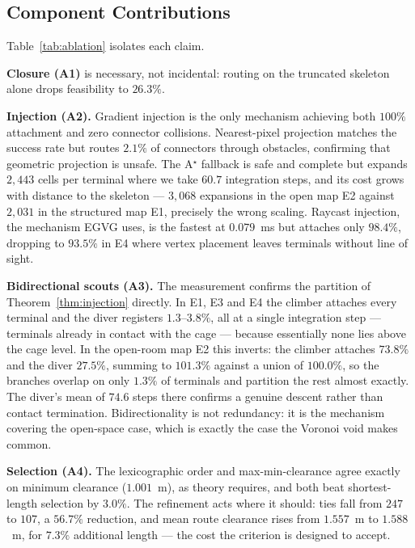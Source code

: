 \documentclass[conference]{IEEEtran}
\begin{document}
\subsection{Component Contributions}

Table~\ref{tab:ablation} isolates each claim.

\textbf{Closure (A1)} is necessary, not incidental: routing on the truncated skeleton alone drops feasibility to $26.3\%$.

\textbf{Injection (A2).} Gradient injection is the only mechanism achieving both $100\%$ attachment and zero connector collisions. Nearest-pixel projection matches the success rate but routes $2.1\%$ of connectors through obstacles, confirming that geometric projection is unsafe. The A$^\star$ fallback is safe and complete but expands $2{,}443$ cells per terminal where we take $60.7$ integration steps, and its cost grows with distance to the skeleton --- $3{,}068$ expansions in the open map E2 against $2{,}031$ in the structured map E1, precisely the wrong scaling. Raycast injection, the mechanism EGVG uses, is the fastest at $0.079$~ms but attaches only $98.4\%$, dropping to $93.5\%$ in E4 where vertex placement leaves terminals without line of sight.

\textbf{Bidirectional scouts (A3).} The measurement confirms the partition of Theorem~\ref{thm:injection} directly. In E1, E3 and E4 the climber attaches every terminal and the diver registers $1.3$--$3.8\%$, all at a single integration step --- terminals already in contact with the cage --- because essentially none lies above the cage level. In the open-room map E2 this inverts: the climber attaches $73.8\%$ and the diver $27.5\%$, summing to $101.3\%$ against a union of $100.0\%$, so the branches overlap on only $1.3\%$ of terminals and partition the rest almost exactly. The diver's mean of $74.6$ steps there confirms a genuine descent rather than contact termination. Bidirectionality is not redundancy: it is the mechanism covering the open-space case, which is exactly the case the Voronoi void makes common.

\textbf{Selection (A4).} The lexicographic order and max-min-clearance agree exactly on minimum clearance ($1.001$~m), as theory requires, and both beat shortest-length selection by $3.0\%$. The refinement acts where it should: ties fall from $247$ to $107$, a $56.7\%$ reduction, and mean route clearance rises from $1.557$~m to $1.588$~m, for $7.3\%$ additional length --- the cost the criterion is designed to accept.
\end{document}
